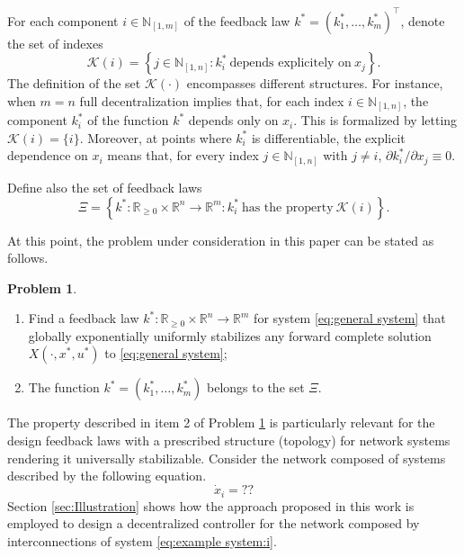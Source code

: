 \documentclass[10pt,twocolumn,twoside]{IEEEtran}
\theoremstyle{plain}
\theoremstyle{definition}
\newtheorem{problem}[theorem]{Problem}
\theoremstyle{remark}
\begin{document}
For each component $i\in\mathbb{N}_{[1,m]}$ of the feedback law $k^\ast=(k_1^\ast,\ldots,k_m^\ast)^\top$, denote the set of indexes
\begin{equation*}
	\mathscr{K}(i)=\left\{j\in\mathbb{N}_{[1,n]}:k_i^\ast\ \text{depends explicitely on}\ x_j \right\}.
\end{equation*}
The definition of the set $\mathscr{K}(\cdot)$ encompasses different structures. For instance, when $m=n$ full decentralization implies that, for each index $i\in\mathbb{N}_{[1,n]}$, the component $k_i^\ast$ of the function $k^\ast$ depends only on $x_i$. This is formalized by letting $\mathscr{K}(i)=\{i\}$. Moreover, at points where $k_i^\ast$ is differentiable, the explicit dependence on $x_i$ means that, for every index $j\in\mathbb{N}_{[1,n]}$ with $j\neq i$, $\partial k_i^\ast/\partial x_j\equiv0$.

Define also the set of feedback laws
\begin{equation*}
	\Xi=\left\{k^\ast:\mathbb{R}_{\geq0}\times\mathbb{R}^n\to\mathbb{R}^m:k_i^\ast\ \text{has the property}\ \mathscr{K}(i)\right\}.
\end{equation*}

At this point, the problem under consideration in this paper can be stated as follows.

\begin{problem}\label{problem formulation}\hfill
	\begin{enumerate}
		\item Find a feedback law $k^\ast:\mathbb{R}_{\geq0}\times\mathbb{R}^n\to\mathbb{R}^m$ for system \eqref{eq:general system} that globally exponentially uniformly stabilizes any forward complete solution $X(\cdot,x^\ast,u^\ast)$ to \eqref{eq:general system};
		
		\item The function $k^\ast=(k_1^\ast,\ldots,k_m^\ast)$ belongs to the set $\Xi$.
		\end{enumerate}
\end{problem}



The property described in item 2 of Problem \ref{problem formulation} is particularly relevant for the design feedback laws with a prescribed structure (topology) for network systems rendering it universally stabilizable. Consider the network composed of systems described by the following equation.
\begin{equation}\label{eq:example system:i}
	\dot{x}_i=??
\end{equation}
Section \ref{sec:Illustration} shows how the approach proposed in this work is employed to design a decentralized controller for the network composed by interconnections of system \eqref{eq:example system:i}.
\end{document}
